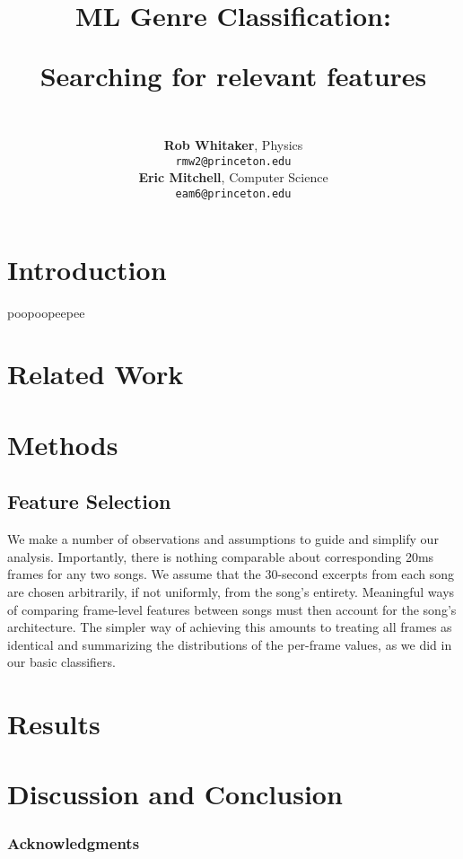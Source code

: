 \documentclass{article} %
\title{ML Genre Classification: \\
\begin{large} Searching for relevant features \end{large} }
\author{\\
\textbf{Rob Whitaker}, 
Physics \\
\texttt{rmw2@princeton.edu} \\
\textbf{Eric Mitchell}, 
Computer Science \\
\texttt{eam6@princeton.edu} \\
}
\begin{document}
\maketitle

\begin{abstract}

\end{abstract}

\section{Introduction}

poopoopeepee

\section{Related Work}

\section{Methods}

\subsection{Feature Selection}
We make a number of observations and assumptions to guide and simplify our analysis.  Importantly, there is nothing comparable about corresponding 20ms frames for any two songs.  We assume that the 30-second excerpts from each song are chosen arbitrarily, if not uniformly, from the song's entirety.  Meaningful ways of comparing frame-level features between songs must then account for the song's architecture.  The simpler way of achieving this amounts to treating all frames as identical and summarizing the distributions of the per-frame values, as we did in our basic classifiers.

\section{Results}

\section{Discussion and Conclusion}

\subsubsection*{Acknowledgments}



\end{document}
